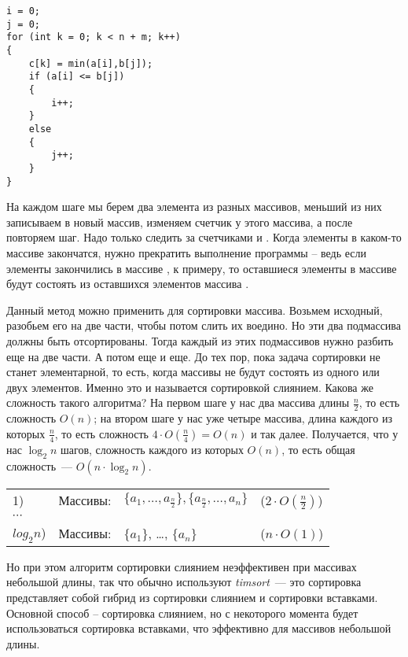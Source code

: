\documentclass [a4paper,12pt] {report} 	%
\begin{document}
\newpage

\lstset {language = C++, frame = single}
\begin{lstlisting}
i = 0;
j = 0;
for (int k = 0; k < n + m; k++)
{
    c[k] = min(a[i],b[j]);
    if (a[i] <= b[j])
    {
        i++;
    }
    else
    {
        j++;
    }
}
\end{lstlisting}

На каждом шаге мы берем два элемента из разных массивов, меньший из них записываем в новый массив, изменяем счетчик у этого массива, а после повторяем шаг. Надо только следить за счетчиками \grqq{} и \grqq{}. Когда элементы в каком-то массиве закончатся, нужно прекратить выполнение программы – ведь если элементы закончились в массиве \grqq{}, к примеру, то оставшиеся элементы в массиве \grqq{} будут состоять из оставшихся элементов массива \grqq{}.

Данный метод можно применить для сортировки массива. Возьмем исходный, разобьем его на две части, чтобы потом \glqq слить\grqq{} их воедино. Но эти два подмассива должны быть отсортированы. Тогда каждый из этих подмассивов нужно разбить еще на две части. А потом еще и еще. До тех пор, пока задача сортировки не станет элементарной, то есть, когда массивы не будут состоять из одного или двух элементов. Именно это и называется сортировкой слиянием.
Какова же сложность такого алгоритма? На первом шаге у нас два массива длины $\frac{n}{2}$, то есть сложность $O(n)$; на втором шаге у нас уже четыре массива, длина каждого из которых $\frac{n}{4}$, то есть сложность $4 \cdot O(\frac{n}{4}) = O(n)$ и так далее. Получается, что у нас $\log_{2}n$ шагов, сложность каждого из которых $O(n)$, то есть общая сложность~--- $O(n \cdot \log_{2}n)$.

\begin{center}
\begin {tabular}{l l l l}
1) & Массивы: & $\{a_{1}, \ldots, a_{\frac{n}{2}}\}, \{a_{\frac{n}{2}}, \ldots, a_{n}\}$ & ($2 \cdot O(\frac{n}{2})$) \\
\multicolumn{4}{l}{$\cdots$} \\
$log_{2}n$) & Массивы: & $\{a_{1}\}$, \ldots, $\{a_{n}\}$ & ($n \cdot O(1)$) \\
\end{tabular}
\end{center}

Но при этом алгоритм сортировки слиянием неэффективен при массивах небольшой длины, так что обычно используют {\slshape timsort}~--- это сортировка представляет собой гибрид из сортировки слиянием и сортировки вставками. Основной способ – сортировка слиянием, но с некоторого момента будет использоваться сортировка вставками, что эффективно для массивов небольшой длины.
\end{document}
